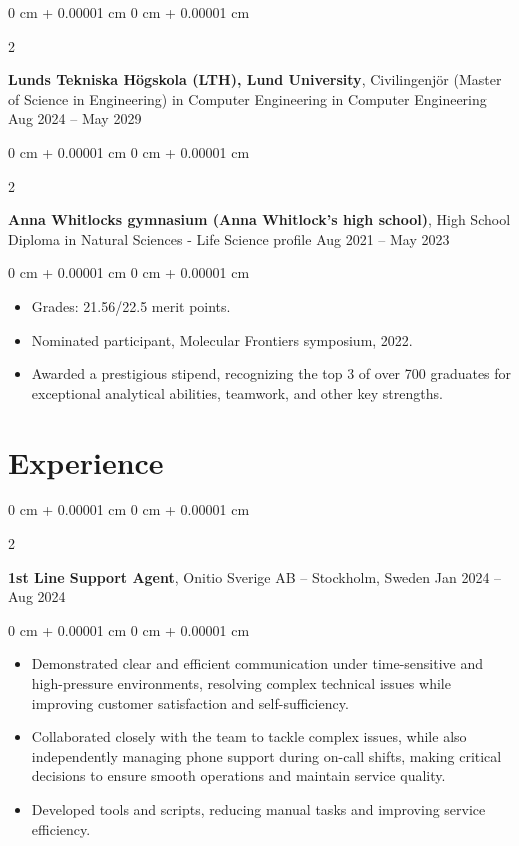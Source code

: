 \documentclass[10pt, letterpaper]{article}
\newenvironment{highlights}{
    \begin{itemize}[
        topsep=0.10 cm,
        parsep=0.10 cm,
        partopsep=0pt,
        itemsep=0pt,
        leftmargin=0 cm + 10pt
    ]
}{
    \end{itemize}
} %
\newenvironment{onecolentry}{
    \begin{adjustwidth}{
        0 cm + 0.00001 cm
    }{
        0 cm + 0.00001 cm
    }
}{
    \end{adjustwidth}
} %
\newenvironment{twocolentry}[2][]{
    \onecolentry
    \def\secondColumn{#2}
    \setcolumnwidth{\fill, 4.5 cm}
    \begin{paracol}{2}
}{
    \switchcolumn \raggedleft \secondColumn
    \end{paracol}
    \endonecolentry
} %
\begin{document}
        
        \begin{twocolentry}{
            Aug 2024 – May 2029
        }
            \textbf{Lunds Tekniska Högskola (LTH), Lund University}, Civilingenjör (Master of Science in Engineering) in Computer Engineering in Computer Engineering\end{twocolentry}



        \vspace{0.2 cm}

        \begin{twocolentry}{
            Aug 2021 – May 2023
        }
            \textbf{Anna Whitlocks gymnasium (Anna Whitlock's high school)}, High School Diploma in Natural Sciences - Life Science profile\end{twocolentry}

        \vspace{0.10 cm}
        \begin{onecolentry}
            \begin{highlights}
                \item Grades: 21.56/22.5 merit points.
                \item Nominated participant, Molecular Frontiers symposium, 2022.
                \item Awarded a prestigious stipend, recognizing the top 3 of over 700 graduates for exceptional analytical abilities, teamwork, and other key strengths.
            \end{highlights}
        \end{onecolentry}



    
    \section{Experience}



        
        \begin{twocolentry}{
            Jan 2024 – Aug 2024
        }
            \textbf{1st Line Support Agent}, Onitio Sverige AB -- Stockholm, Sweden\end{twocolentry}

        \vspace{0.10 cm}
        \begin{onecolentry}
            \begin{highlights}
                \item Demonstrated clear and efficient communication under time-sensitive and high-pressure environments, resolving complex technical issues while improving customer satisfaction and self-sufficiency.
                \item Collaborated closely with the team to tackle complex issues, while also independently managing phone support during on-call shifts, making critical decisions to ensure smooth operations and maintain service quality.
                \item Developed tools and scripts, reducing manual tasks and improving service efficiency.
            \end{highlights}
        \end{onecolentry}
\end{document}
